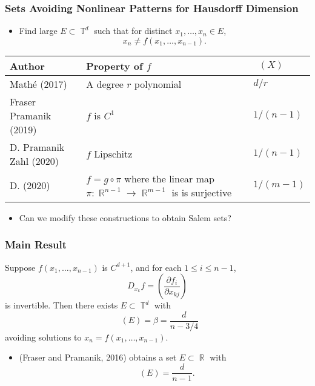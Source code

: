 \documentclass[handout,usenames,dvipsnames]{beamer}
\DeclareMathOperator{\RR}{\mathbb{R}}
\DeclareMathOperator{\TT}{\mathbb{T}}
\DeclareMathOperator{\fordim}{\text{dim}_{\mathbb{F}}}
\DeclareMathOperator{\hausdim}{\text{dim}_{\mathbb{H}}}
\begin{document}
\begin{frame}
    \frametitle{Sets Avoiding Nonlinear Patterns for Hausdorff Dimension}

    \begin{itemize}
        \pause
        \item Find large $E \subset \TT^d$ such that for distinct $x_1,\dots,x_n \in E$,
        \[ x_n \neq f(x_1,\dots,x_{n-1}). \]
    \end{itemize}

    \pause
    \begin{center}
    \begin{tabular}{| p{4cm} | p{4cm} | p{1.6cm} |}
        \hline
        \textbf{Author} & \textbf{Property of $f$} & $\hausdim(X)$\\
        \hline
        Math\'{e} (2017) & A degree $r$ polynomial & $d/r$\\
        \hline
        Fraser Pramanik (2019) & $f$ is $C^1$ & $1/(n-1)$\\
        \hline
        D. Pramanik Zahl (2020) & $f$ Lipschitz & $1/(n-1)$\\
        \hline
        D. (2020) & $f = g \circ \pi$ where the linear map $\pi: \RR^{n-1} \to \RR^{m-1}$ is is surjective & $1/(m-1)$\\
        \hline
    \end{tabular}
    \end{center}

    \begin{itemize}
        \item Can we modify these constructions to obtain Salem sets?
    \end{itemize}
\end{frame}







\begin{frame}
    \frametitle{Main Result}

    \begin{theorem}
        Suppose $f(x_1,\dots,x_{n-1})$ is $C^{d+1}$, and for each $1 \leq i \leq n-1$,
        \[ D_{x_k} f = \left( \frac{\partial f_i}{\partial x_{kj}} \right) \]
        is invertible. Then there exists $E \subset \TT^d$ with
        \[ \fordim(E) = \beta = \frac{d}{n - 3/4} \]
        avoiding solutions to $x_n = f(x_1,\dots,x_{n-1})$.
    \end{theorem}

    \begin{itemize}
        \item (Fraser and Pramanik, 2016) obtains a set $E \subset \RR$ with
        \[ \hausdim(E) = \frac{d}{n - 1}. \]
    \end{itemize}
\end{frame}
\end{document}
